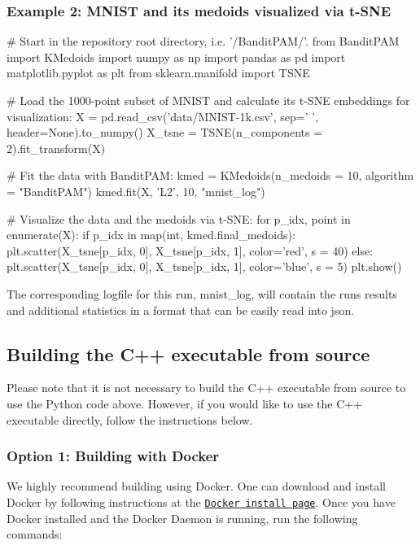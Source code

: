 \subsubsection*{Example 2\+: M\+N\+I\+ST and its medoids visualized via t-\/\+S\+NE}


\begin{DoxyCode}
# Start in the repository root directory, i.e. '/BanditPAM/'.
from BanditPAM import KMedoids
import numpy as np
import pandas as pd
import matplotlib.pyplot as plt
from sklearn.manifold import TSNE

# Load the 1000-point subset of MNIST and calculate its t-SNE embeddings for visualization:
X = pd.read\_csv('data/MNIST-1k.csv', sep=' ', header=None).to\_numpy()
X\_tsne = TSNE(n\_components = 2).fit\_transform(X)

# Fit the data with BanditPAM:
kmed = KMedoids(n\_medoids = 10, algorithm = "BanditPAM")
kmed.fit(X, 'L2', 10, "mnist\_log")

# Visualize the data and the medoids via t-SNE:
for p\_idx, point in enumerate(X):
    if p\_idx in map(int, kmed.final\_medoids):
        plt.scatter(X\_tsne[p\_idx, 0], X\_tsne[p\_idx, 1], color='red', s = 40)
    else:
        plt.scatter(X\_tsne[p\_idx, 0], X\_tsne[p\_idx, 1], color='blue', s = 5)
plt.show()
\end{DoxyCode}
 The corresponding logfile for this run, {\ttfamily mnist\+\_\+log}, will contain the run\textquotesingle{}s results and additional statistics in a format that can be easily read into json.

\subsection*{Building the C++ executable from source}

Please note that it is not necessary to build the C++ executable from source to use the Python code above. However, if you would like to use the C++ executable directly, follow the instructions below.

\subsubsection*{Option 1\+: Building with Docker}

We highly recommend building using Docker. One can download and install Docker by following instructions at the \href{https://docs.docker.com/get-docker/}{\tt Docker install page}. Once you have Docker installed and the Docker Daemon is running, run the following commands\+:


